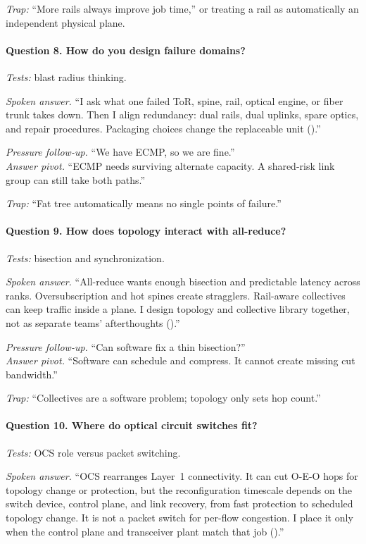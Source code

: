 \textit{Trap:} ``More rails always improve job time,'' or treating a rail as
automatically an independent physical plane.

\paragraph{Question 8. How do you design failure domains?}
\textit{Tests:} blast radius thinking.

\textit{Spoken answer.}
``I ask what one failed ToR, spine, rail, optical engine, or fiber trunk takes
down. Then I align redundancy: dual rails, dual uplinks, spare optics, and
repair procedures. Packaging choices change the replaceable unit
().''

\textit{Pressure follow-up.} ``We have ECMP, so we are fine.''\\
\textit{Answer pivot.} ``ECMP needs surviving alternate capacity. A
shared-risk link group can still take both paths.''

\textit{Trap:} ``Fat tree automatically means no single points of failure.''

\paragraph{Question 9. How does topology interact with all-reduce?}
\textit{Tests:} bisection and synchronization.

\textit{Spoken answer.}
``All-reduce wants enough bisection and predictable latency across ranks.
Oversubscription and hot spines create stragglers. Rail-aware collectives can
keep traffic inside a plane. I design topology and collective library together,
not as separate teams' afterthoughts ().''

\textit{Pressure follow-up.} ``Can software fix a thin bisection?''\\
\textit{Answer pivot.} ``Software can schedule and compress. It cannot create
missing cut bandwidth.''

\textit{Trap:} ``Collectives are a software problem; topology only sets hop
count.''

\paragraph{Question 10. Where do optical circuit switches fit?}
\textit{Tests:} OCS role versus packet switching.

\textit{Spoken answer.}
``OCS rearranges Layer~1 connectivity. It can cut O-E-O hops for topology
change or protection, but the reconfiguration timescale depends on the switch
device, control plane, and link recovery, from fast protection to scheduled
topology change. It is not a packet switch for per-flow congestion. I place it
only when the control plane and transceiver plant match that job
().''

